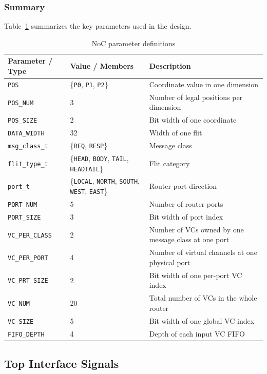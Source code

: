 \documentclass[11pt,a4paper]{article}
\begin{document}
\subsubsection*{Summary}
Table~\ref{tab:noc_parameters} summarizes the key parameters used in the design.

\begin{table}[h]
\centering
\caption{NoC parameter definitions}
\label{tab:noc_parameters}
\begin{tabular}{p{}p{}p{}}
\hline
\textbf{Parameter / Type} & \textbf{Value / Members} & \textbf{Description} \\
\hline
\texttt{POS} & \{\texttt{P0}, \texttt{P1}, \texttt{P2}\} & Coordinate value in one dimension \\
\texttt{POS\_NUM} & 3 & Number of legal positions per dimension \\
\texttt{POS\_SIZE} & 2 & Bit width of one coordinate \\
\texttt{DATA\_WIDTH} & 32 & Width of one flit \\
\texttt{msg\_class\_t} & \{\texttt{REQ}, \texttt{RESP}\} & Message class \\
\texttt{flit\_type\_t} & \{\texttt{HEAD}, \texttt{BODY}, \texttt{TAIL}, \texttt{HEADTAIL}\} & Flit category \\
\texttt{port\_t} & \{\texttt{LOCAL}, \texttt{NORTH}, \texttt{SOUTH}, \texttt{WEST}, \texttt{EAST}\} & Router port direction \\
\texttt{PORT\_NUM} & 5 & Number of router ports \\
\texttt{PORT\_SIZE} & 3 & Bit width of port index \\
\texttt{VC\_PER\_CLASS} & 2 & Number of VCs owned by one message class at one port \\
\texttt{VC\_PER\_PORT} & 4 & Number of virtual channels at one physical port \\
\texttt{VC\_PRT\_SIZE} & 2 & Bit width of one per-port VC index \\
\texttt{VC\_NUM} & 20 & Total number of VCs in the whole router \\
\texttt{VC\_SIZE} & 5 & Bit width of one global VC index \\
\texttt{FIFO\_DEPTH} & 4 & Depth of each input VC FIFO \\

\hline
\end{tabular}
\end{table}


\subsection{Top Interface Signals}
\end{document}
